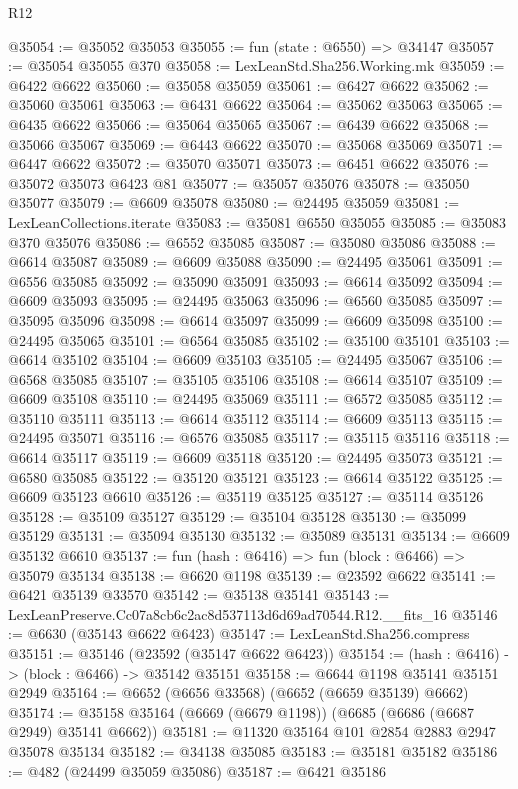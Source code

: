 \begin{lexlean}{R12}
\begin{coremodule}
@35054 := @35052 @35053
@35055 := fun (state : @6550) => @34147
@35057 := @35054 @35055 @370
@35058 := LexLeanStd.Sha256.Working.mk
@35059 := @6422 @6622
@35060 := @35058 @35059
@35061 := @6427 @6622
@35062 := @35060 @35061
@35063 := @6431 @6622
@35064 := @35062 @35063
@35065 := @6435 @6622
@35066 := @35064 @35065
@35067 := @6439 @6622
@35068 := @35066 @35067
@35069 := @6443 @6622
@35070 := @35068 @35069
@35071 := @6447 @6622
@35072 := @35070 @35071
@35073 := @6451 @6622
@35076 := @35072 @35073 @6423 @81
@35077 := @35057 @35076
@35078 := @35050 @35077
@35079 := @6609 @35078
@35080 := @24495 @35059
@35081 := LexLeanCollections.iterate
@35083 := @35081 @6550 @35055
@35085 := @35083 @370 @35076
@35086 := @6552 @35085
@35087 := @35080 @35086
@35088 := @6614 @35087
@35089 := @6609 @35088
@35090 := @24495 @35061
@35091 := @6556 @35085
@35092 := @35090 @35091
@35093 := @6614 @35092
@35094 := @6609 @35093
@35095 := @24495 @35063
@35096 := @6560 @35085
@35097 := @35095 @35096
@35098 := @6614 @35097
@35099 := @6609 @35098
@35100 := @24495 @35065
@35101 := @6564 @35085
@35102 := @35100 @35101
@35103 := @6614 @35102
@35104 := @6609 @35103
@35105 := @24495 @35067
@35106 := @6568 @35085
@35107 := @35105 @35106
@35108 := @6614 @35107
@35109 := @6609 @35108
@35110 := @24495 @35069
@35111 := @6572 @35085
@35112 := @35110 @35111
@35113 := @6614 @35112
@35114 := @6609 @35113
@35115 := @24495 @35071
@35116 := @6576 @35085
@35117 := @35115 @35116
@35118 := @6614 @35117
@35119 := @6609 @35118
@35120 := @24495 @35073
@35121 := @6580 @35085
@35122 := @35120 @35121
@35123 := @6614 @35122
@35125 := @6609 @35123 @6610
@35126 := @35119 @35125
@35127 := @35114 @35126
@35128 := @35109 @35127
@35129 := @35104 @35128
@35130 := @35099 @35129
@35131 := @35094 @35130
@35132 := @35089 @35131
@35134 := @6609 @35132 @6610
@35137 := fun (hash : @6416) => fun (block : @6466) => @35079 @35134
@35138 := @6620 @1198
@35139 := @23592 @6622
@35141 := @6421 @35139 @33570
@35142 := @35138 @35141
@35143 := LexLeanPreserve.Cc07a8cb6c2ac8d537113d6d69ad70544.R12.__fits_16
@35146 := @6630 (@35143 @6622 @6423)
@35147 := LexLeanStd.Sha256.compress
@35151 := @35146 (@23592 (@35147 @6622 @6423))
@35154 := (hash : @6416) -> (block : @6466) -> @35142 @35151
@35158 := @6644 @1198 @35141 @35151 @2949
@35164 := @6652 (@6656 @33568) (@6652 (@6659 @35139) @6662)
@35174 := @35158 @35164 (@6669 (@6679 @1198)) (@6685 (@6686 (@6687 @2949) @35141 @6662))
@35181 := @11320 @35164 @101 @2854 @2883 @2947 @35078 @35134
@35182 := @34138 @35085
@35183 := @35181 @35182
@35186 := @482 (@24499 @35059 @35086)
@35187 := @6421 @35186

\end{coremodule}
\end{lexlean}
